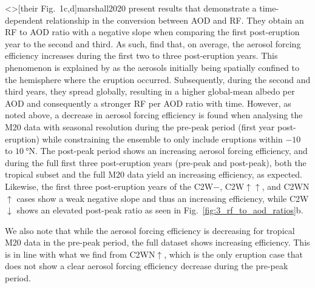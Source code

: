 \documentclass[draft]{agujournal2019}
\begin{document}
  \citeA<>[their Fig.\ 1c,d]{marshall2020} present results that demonstrate a
  time-dependent relationship in the conversion between AOD and RF. They obtain an RF to
  AOD ratio with a negative slope when comparing the first post-eruption year to the
  second and third. As such,  find that, on average, the aerosol
  forcing efficiency increases during the first two to three post-eruption years. This
  phenomenon is explained by  as the aerosols initially being
  spatially confined to the hemisphere where the eruption occurred. Subsequently, during
  the second and third years, they spread globally, resulting in a higher global-mean
  albedo per AOD and consequently a stronger RF per AOD ratio with time. However, as
  noted above, a decrease in aerosol forcing efficiency is found when analysing the M20
  data with seasonal resolution during the pre-peak period (first year post-eruption)
  while constraining the ensemble to only include eruptions within \(-10\) to
  \(\SI{10}{\degree\mathrm{N}}\). The post-peak period shows an increasing aerosol
  forcing efficiency, and during the full first three post-eruption years (pre-peak and
  post-peak), both the tropical subset and the full M20 data yield an increasing
  efficiency, as expected. Likewise, the first three post-eruption years of the
  C2W\(-\), C2W\(\uparrow\uparrow\), and C2WN\(\uparrow\) cases show a weak negative
  slope and thus an increasing efficiency, while C2W\(\downarrow\) shows an elevated
  post-peak ratio as seen in Fig.~\ref{fig:3_rf_to_aod_ratios}b.

  We also note that while the aerosol forcing efficiency is decreasing for tropical M20
  data in the pre-peak period, the full dataset shows increasing efficiency. This is in
  line with what we find from C2WN\(\uparrow\), which is the only eruption case that
  does not show a clear aerosol forcing efficiency decrease during the pre-peak period.
\end{document}
